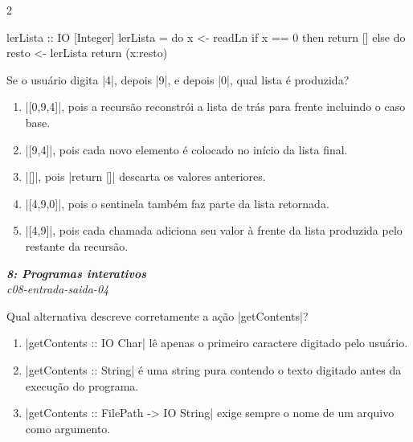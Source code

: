 \documentclass[a4paper,10pt,brazil]{article}
\begin{document}
\begin{multicols}{2}
\begin{haskellcode}
lerLista :: IO [Integer]
lerLista = do
  x <- readLn
  if x == 0
    then return []
    else do
      resto <- lerLista
      return (x:resto)
\end{haskellcode}

Se o usuário digita \haskellinline|4|, depois \haskellinline|9|, e depois \haskellinline|0|, qual lista é produzida?

\begin{enumerate}
  \item \haskellinline|[0,9,4]|, pois a recursão reconstrói a lista de trás para frente incluindo o caso base.

  \item \haskellinline|[9,4]|, pois cada novo elemento é colocado no início da lista final.

  \item \haskellinline|[]|, pois \haskellinline|return []| descarta os valores anteriores.

  \item \haskellinline|[4,9,0]|, pois o sentinela também faz parte da lista retornada.

  \item \haskellinline|[4,9]|, pois cada chamada adiciona seu valor à frente da lista produzida pelo restante da recursão.


\end{enumerate}

\begin{flushright}
  \footnotesize
  \textit{\textbf{8: Programas interativos}}\\
  \textit{c08-entrada-saida-04}\\

\end{flushright}
Qual alternativa descreve corretamente a ação \haskellinline|getContents|?

\begin{enumerate}
  \item \haskellinline|getContents :: IO Char| lê apenas o primeiro caractere digitado pelo usuário.

  \item \haskellinline|getContents :: String| é uma string pura contendo o texto digitado antes da execução do programa.

  \item \haskellinline|getContents :: FilePath -> IO String| exige sempre o nome de um arquivo como argumento.


\end{enumerate}
\end{multicols}
\end{document}
